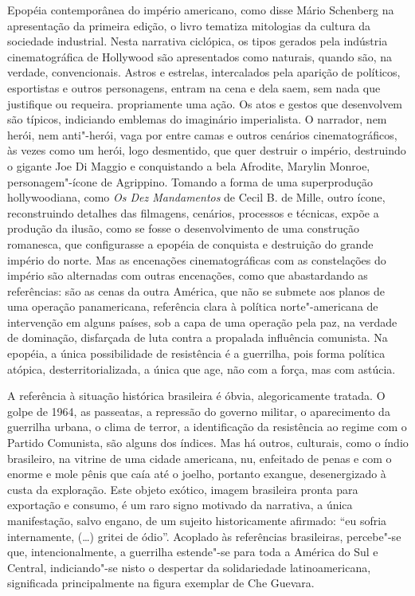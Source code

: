 Epopéia contemporânea do império americano, como disse Mário Schenberg
na apresentação da primeira edição, o livro tematiza mitologias da
cultura da sociedade industrial. Nesta narrativa ciclópica, os tipos
gerados pela indústria cinematográfica de Hollywood são apresentados
como naturais, quando são, na verdade, convencionais. Astros e estrelas,
intercalados pela aparição de políticos, esportistas e outros
personagens, entram na cena e dela saem, sem nada que justifique ou
requeira. propriamente uma ação. Os atos e gestos que desenvolvem são
típicos, indiciando emblemas do imaginário imperialista. O narrador, nem
herói, nem anti"-herói, vaga por entre camas e outros cenários
cinematográficos, às vezes como um herói, logo desmentido, que quer
destruir o império, destruindo o gigante Joe Di Maggio e conquistando a
bela Afrodite, Marylin Monroe, personagem"-ícone de Agrippino. Tomando a
forma de uma superprodução hollywoodiana, como \emph{Os Dez Mandamentos}
de Cecil B. de Mille, outro ícone, reconstruindo detalhes das filmagens,
cenários, processos e técnicas, expõe a produção da ilusão, como se
fosse o desenvolvimento de uma construção romanesca, que configurasse a
epopéia de conquista e destruição do grande império do norte. Mas as
encenações cinematográficas com as constelações do império são
alternadas com outras encenações, como que abastardando as referências:
são as cenas da outra América, que não se submete aos planos de uma
operação panamericana, referência clara à política norte"-americana de
intervenção em alguns países, sob a capa de uma operação pela paz, na
verdade de dominação, disfarçada de luta contra a propalada influência
comunista. Na epopéia, a única possibilidade de resistência é a
guerrilha, pois forma política atópica, desterritorializada, a única que
age, não com a força, mas com astúcia.

A referência à situação histórica brasileira é óbvia, alegoricamente
tratada. O golpe de 1964, as passeatas, a repressão do governo militar,
o aparecimento da guerrilha urbana, o clima de terror, a identificação
da resistência ao regime com o Partido Comunista, são alguns dos
índices. Mas há outros, culturais, como o índio brasileiro, na vitrine
de uma cidade americana, nu, enfeitado de penas e com o enorme e mole
pênis que caía até o joelho, portanto exangue, desenergizado à custa da
exploração. Este objeto exótico, imagem brasileira pronta para
exportação e consumo, é um raro signo motivado da narrativa, a única
manifestação, salvo engano, de um sujeito historicamente afirmado: ``eu
sofria internamente, (\ldots{}) gritei de ódio''. Acoplado às referências
brasileiras, percebe"-se que, intencionalmente, a guerrilha estende"-se
para toda a América do Sul e Central, indiciando"-se nisto o despertar da
solidariedade latinoamericana, significada principalmente na figura
exemplar de Che Guevara.

